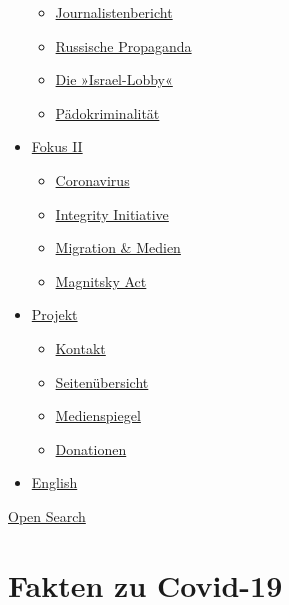 \begin{itemize}
  \begin{itemize}
  \tightlist
  \item
    \href{https://swprs.org/bericht-eines-journalisten/}{Journalistenbericht}
  \item
    \href{https://swprs.org/russische-propaganda/}{Russische Propaganda}
  \item
    \href{https://swprs.org/die-israel-lobby-fakten-und-mythen/}{Die
    »Israel-Lobby«}
  \item
    \href{https://swprs.org/geopolitik-und-paedokriminalitaet/}{Pädokriminalität}
  \end{itemize}
\item
  \href{https://swprs.org/migration-und-medien/}{Fokus II}

  \begin{itemize}
  \tightlist
  \item
    \href{https://swprs.org/covid-19-hinweis-ii/}{Coronavirus}
  \item
    \href{https://swprs.org/die-integrity-initiative/}{Integrity
    Initiative}
  \item
    \href{https://swprs.org/migration-und-medien/}{Migration \& Medien}
  \item
    \href{https://swprs.org/der-fall-magnitsky/}{Magnitsky Act}
  \end{itemize}
\item
  \href{https://swprs.org/kontakt/}{Projekt}

  \begin{itemize}
  \tightlist
  \item
    \href{https://swprs.org/kontakt/}{Kontakt}
  \item
    \href{https://swprs.org/uebersicht/}{Seitenübersicht}
  \item
    \href{https://swprs.org/medienspiegel/}{Medienspiegel}
  \item
    \href{https://swprs.org/donationen/}{Donationen}
  \end{itemize}
\item
  \href{https://swprs.org/contact/}{English}
\end{itemize}

\protect\hyperlink{}{Open Search}

\hypertarget{fakten-zu-covid-19}{%
\section{Fakten zu Covid-19}\label{fakten-zu-covid-19}}

